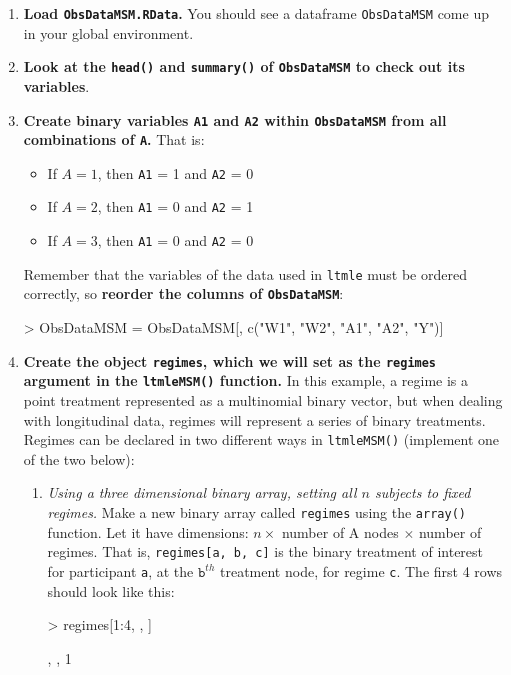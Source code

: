\documentclass[answers]{exam}
\begin{document}
\begin{enumerate}
\item \textbf{Load \texttt{ObsDataMSM.RData}.} You should see a dataframe \texttt{ObsDataMSM} come up in your global environment.
\item \textbf{Look at the \texttt{head()} and \texttt{summary()} of \texttt{ObsDataMSM} to check out its variables}.
\item \textbf{Create binary variables \texttt{A1} and \texttt{A2} within \texttt{ObsDataMSM} from all combinations of \texttt{A}.} That is:
\begin{itemize}
\item If $A = 1$, then \texttt{A1} = 1 and \texttt{A2} = 0
\item If $A = 2$, then \texttt{A1} = 0 and \texttt{A2} = 1
\item If $A = 3$, then \texttt{A1} = 0 and \texttt{A2} = 0
\end{itemize}
Remember that the variables of the data used in \texttt{ltmle} must be ordered correctly, so \textbf{reorder the columns of \texttt{ObsDataMSM}}:
\begin{Schunk}
\begin{Sinput}
> ObsDataMSM = ObsDataMSM[, c("W1", "W2", "A1", "A2", "Y")]
\end{Sinput}
\end{Schunk}
\item \textbf{Create the object \texttt{regimes}, which we will set as the \texttt{regimes} argument in the \texttt{ltmleMSM()} function.} In this example, a regime is a point treatment represented as a multinomial binary vector, but when dealing with longitudinal data, regimes will represent a series of binary treatments. Regimes can be declared in two different ways in \texttt{ltmleMSM()} (implement one of the two below):
\begin{enumerate}
\item \textit{Using a three dimensional binary array, setting all $n$ subjects to fixed regimes.} Make a new binary array called \texttt{regimes} using the \texttt{array()} function. Let it have dimensions: $n \times$ number of A nodes $\times$ number of regimes. That is, \texttt{regimes[a, b, c]} is the binary treatment of interest for participant \texttt{a}, at the $\texttt{b}^{th}$ treatment node, for regime \texttt{c}.
The first 4 rows should look like this:
\begin{Schunk}
\begin{Sinput}
> regimes[1:4, , ] 
\end{Sinput}
\begin{Soutput}
, , 1


\end{Soutput}
\end{Schunk}
\end{enumerate}
\end{enumerate}
\end{document}

